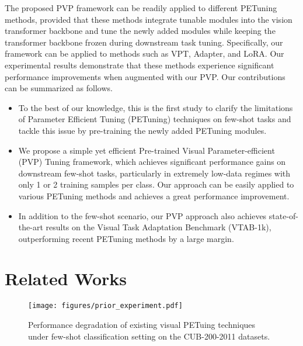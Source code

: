\documentclass[10pt,journal,letterpaper,compsoc]{IEEEtran}
\begin{document}
The proposed PVP framework can be readily applied to different PETuning methods, provided that these methods integrate tunable modules into the vision transformer backbone and tune the newly added modules while keeping the transformer backbone frozen during downstream task tuning. Specifically, our framework can be applied to methods such as VPT\cite{vpt}, Adapter\cite{adapter}, and LoRA\cite{Lora}. Our experimental results demonstrate that these methods experience significant performance improvements when augmented with our PVP.
 Our contributions can be summarized as follows.
\begin{itemize}
\setlength{\parsep}{0pt} 
\setlength{\topsep}{0pt} 
\setlength{\itemsep}{0pt}
\setlength{\parsep}{0pt}
\setlength{\parskip}{0pt}
\item To the best of our knowledge, this is the first study to clarify the limitations of Parameter Efficient Tuning (PETuning) techniques on few-shot tasks and tackle this issue by pre-training the  newly added PETuning modules.
\item We propose a simple yet efficient Pre-trained Visual Parameter-efficient (PVP) Tuning framework, which achieves significant performance gains on downstream few-shot tasks, particularly  in extremely low-data regimes with only 1 or 2 training samples per class. Our approach can be easily applied to various PETuning methods and achieves a great performance improvement. 
\item In addition to the few-shot scenario, our PVP approach also achieves state-of-the-art results on the Visual Task Adaptation Benchmark (VTAB-1k), outperforming recent PETuning methods by a large margin.
\end{itemize}


\section{Related Works}

\begin{figure}[t]
    \centering
    \texttt{[image: figures/prior\_experiment.pdf]}
    \caption{Performance degradation of existing visual PETuing techniques under few-shot classification setting on the CUB-200-2011 datasets.}
    \label{fig:prior_experiment}
\end{figure}
\end{document}
